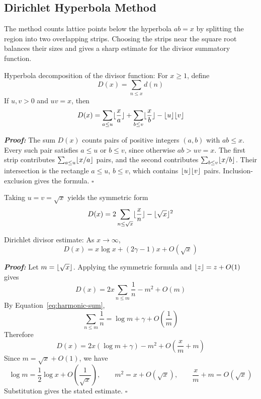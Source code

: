 \documentclass[a4paper,11pt,abstracton]{scrartcl}
\DeclarePairedDelimiter{\floor}{\lfloor}{\rfloor}
\theoremstyle{dotlessP}
\theoremstyle{dotlessS}
\theoremstyle{remark}
\theoremstyle{definition}
\begin{document}
\subsection{Dirichlet Hyperbola Method}

The method counts lattice points below the hyperbola $ab=x$ by splitting
the region into two overlapping strips. Choosing the strips near the
square root balances their sizes and gives a sharp estimate for the
divisor summatory function.

\begin{mainbox}{Hyperbola decomposition of the divisor function:}
For $x\geq1$, define
\[
    D(x)=\sum_{n\leq x}d(n)
\]
If $u,v>0$ and $uv=x$, then
\[
    D(x)=\sum_{a\leq u}\floor{\frac xa}
       +\sum_{b\leq v}\floor{\frac xb}
       -\floor{u}\floor{v}
\]
\end{mainbox}

\begin{claim_box}
\textbf{\textit{Proof:}}
The sum $D(x)$ counts pairs of positive integers $(a,b)$ with $ab\leq x$.
Every such pair satisfies $a\leq u$ or $b\leq v$, since otherwise
$ab>uv=x$. The first strip contributes
$\sum_{a\leq u}\floor{x/a}$ pairs, and the second contributes
$\sum_{b\leq v}\floor{x/b}$. Their intersection is the rectangle
$a\leq u$, $b\leq v$, which contains $\floor{u}\floor{v}$ pairs.
Inclusion-exclusion gives the formula.
\hfill$\square$
\end{claim_box}

Taking $u=v=\sqrt{x}$ yields the symmetric form
\[
    D(x)=2\sum_{n\leq\sqrt{x}}\floor{\frac xn}
       -\floor{\sqrt{x}}^2
\]

\begin{mainbox}{Dirichlet divisor estimate:}
As $x\to\infty$,
\[
    D(x)=x\log x+(2\gamma-1)x+O(\sqrt{x})
\]
\end{mainbox}

\begin{claim_box}
\textbf{\textit{Proof:}}
Let $m=\floor{\sqrt{x}}$. Applying the symmetric formula and
$\floor{z}=z+O(1)$ gives
\[
    D(x)=2x\sum_{n\leq m}\frac1n-m^2+O(m)
\]
By Equation~\eqref{eq:harmonic-sum},
\[
    \sum_{n\leq m}\frac1n=\log m+\gamma+O\!\left(\frac1m\right)
\]
Therefore
\[
    D(x)=2x(\log m+\gamma)-m^2+O\!\left(\frac{x}{m}+m\right)
\]
Since $m=\sqrt{x}+O(1)$, we have
\[
    \log m=\frac12\log x+O\!\left(\frac1{\sqrt{x}}\right),
    \qquad
    m^2=x+O(\sqrt{x}),
    \qquad
    \frac{x}{m}+m=O(\sqrt{x})
\]
Substitution gives the stated estimate.
\hfill$\square$
\end{claim_box}
\end{document}
